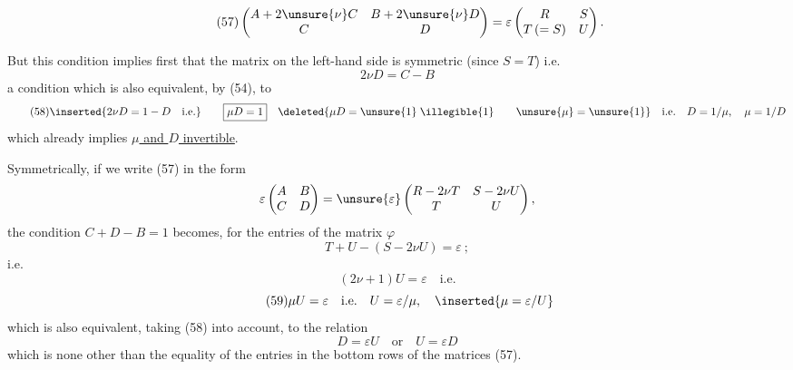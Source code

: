 \[
\tag{57}
\begin{pmatrix}
 A+2\unsure{\nu}C&B+2\unsure{\nu}D\\
 C&D
\end{pmatrix}
=\varepsilon\begin{pmatrix}R&S\\T\,(=S)&U\end{pmatrix}.
\]

But this condition implies first that the matrix on the left-hand side is symmetric (since $S=T$) i.e.
\[
2\nu D=C-B
\]
a condition which is also equivalent, by (54), to
\[
\tag{58}
\inserted{2\nu D=1-D\quad\text{i.e.}}\qquad
\boxed{\mu D=1}\quad
\deleted{\mu D=\unsure{1}\;\illegible{1}\qquad\unsure{\mu}=\unsure{1}}\quad
\text{i.e.}\quad D=1/\mu,\quad\mu=1/D
\]
which already implies \uline{$\mu$ and $D$ invertible}.

Symmetrically, if we write (57) in the form
\[
\varepsilon\begin{pmatrix}A&B\\C&D\end{pmatrix}
=\unsure{\varepsilon}\begin{pmatrix}R-2\nu T&S-2\nu U\\T&U\end{pmatrix},
\]
the condition $C+D-B=1$ becomes, for the entries of the matrix $\varphi$
\[
T+U-(S-2\nu U)=\varepsilon\ ;
\]
i.e.
\[
(2\nu+1)U=\varepsilon\quad\text{i.e.}
\]
\[
\tag{59}
\mu U=\varepsilon\quad\text{i.e.}\quad U=\varepsilon/\mu,
\quad\inserted{\mu=\varepsilon/U}
\]
which is also equivalent, taking (58) into account, to the relation
\[
\tag{60}
D=\varepsilon U\quad\text{or}\quad U=\varepsilon D
\]
which is none other than the equality of the entries in the bottom rows of the matrices (57).

